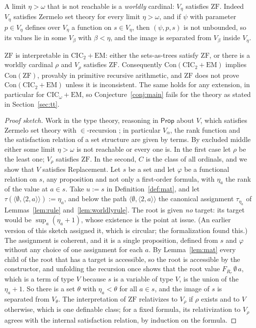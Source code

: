 \documentclass[10pt]{article}
\newcommand{\Prop}{\mathsf{Prop}}
\newcommand{\CIC}{\mathrm{CIC}}
\newcommand{\ZF}{\mathrm{ZF}}
\newcommand{\EM}{\mathrm{EM}}
\newcommand{\Con}{\mathrm{Con}}
\begin{document}
A limit $\eta>\omega$ that is not reachable is a \emph{worldly} cardinal:
$V_\eta$ satisfies $\ZF$. Indeed $V_\eta$ satisfies Zermelo set theory for
every limit $\eta>\omega$, and if $\psi$ with parameter $p\in V_\eta$ defines over
$V_\eta$ a function on $s\in V_\eta$, then $(\psi,p,s)$ is not unbounded, so
its values lie in some $V_\beta$ with $\beta<\eta$, and the image is separated
from $V_\beta$ inside $V_\eta$.

\begin{theorem}[claimed]\label{thm:bigacc}
$\ZF$ is interpretable in $\CIC_2+\EM$: either the sets-as-trees satisfy
$\ZF$, or there is a worldly cardinal $\rho$ and $V_\rho$ satisfies $\ZF$.
Consequently $\Con(\CIC_2+\EM)$ implies $\Con(\ZF)$, provably in
primitive recursive arithmetic, and $\ZF$ does not prove
$\Con(\CIC_2+\EM)$ unless it is inconsistent. The same holds for any
extension, in particular for $\CIC_\omega+\EM$, so
Conjecture~\ref{conj:main} fails for the theory as stated in
Section~\ref{sec:tt}.
\end{theorem}
\begin{proof}[Proof sketch]
Work in the type theory, reasoning in $\Prop$ about $V$, which satisfies
Zermelo set theory with $\in$-recursion \cite{paper2}; in particular $V_\alpha$,
the rank function and the satisfaction relation of a set structure are
given by terms. By excluded middle either some limit $\eta>\omega$ is not
reachable or every one is. In the first case let $\rho$ be the least
one; $V_\rho$ satisfies $\ZF$. In the second, $C$ is the class of all
ordinals, and we show that $V$ satisfies Replacement. Let $s$ be a set
and let $\varphi$ be a functional relation on $s$, any proposition and not
only a first-order formula, with $\eta_a$ the rank of the value at $a\in
s$. Take $u:=s$ in Definition~\ref{def:mat}, and let
$\tau(\langle\emptyset,\langle 2,a\rangle\rangle):=\eta_a$, and below the path
$\langle\emptyset,\langle 2,a\rangle\rangle$ the canonical assignment
$\tau_{\eta_a}$ of Lemmas~\ref{lem:rule} and~\ref{lem:worldlyrule}. The root
is given \emph{no} target: its target would be $\sup_a(\eta_a+1)$, whose
existence is the point at issue. (An earlier version of this sketch
assigned it, which is circular; the formalization found this.) The
assignment is coherent, and it is a single proposition, defined from $s$
and $\varphi$ without any choice of one assignment for each $a$. By
Lemma~\ref{lem:mat} every child of the root that has a target is
accessible, so the root is accessible by the constructor, and unfolding
the recursion once shows that the root value $F_{R_\tau}\,\emptyset\,a$, which
is a term of type $V$ because $s$ is a variable of type $V$, is the union
of the $\eta_a+1$. So there is a set $\theta$ with $\eta_a<\theta$ for all $a\in s$,
and the image of $s$ is separated from $V_\theta$. The interpretation of
$\ZF$ relativizes to $V_\rho$ if $\rho$ exists and to $V$ otherwise, which is
one definable class; for a fixed formula, its relativization to $V_\rho$
agrees with the internal satisfaction relation, by induction on the
formula.
\end{proof}
\end{document}
